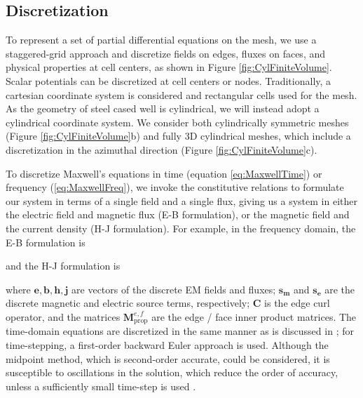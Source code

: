 \subsection{Discretization}
To represent a set of partial differential equations on the mesh, we use a staggered-grid approach \citep{Yee1966} and discretize fields on edges, fluxes on faces, and physical properties at cell centers, as shown in Figure \ref{fig:CylFiniteVolume}. Scalar potentials can be discretized at cell centers or nodes. Traditionally, a cartesian coordinate system is considered and rectangular cells used for the mesh. As the geometry of steel cased well is cylindrical, we will instead adopt a cylindrical coordinate system. We consider both cylindrically symmetric meshes (Figure \ref{fig:CylFiniteVolume}b) and fully 3D cylindrical meshes, which include a discretization in the azimuthal direction (Figure \ref{fig:CylFiniteVolume}c).




To discretize Maxwell's equations in time (equation \ref{eq:MaxwellTime}) or frequency (\ref{eq:MaxwellFreq}), we invoke the constitutive relations to formulate our system in terms of a single field and a single flux, giving us a system in either the electric field and magnetic flux (E-B formulation), or the magnetic field and the current density (H-J formulation). For example, in the frequency domain, the E-B formulation is

and the H-J formulation is

where $\mathbf{e}, \mathbf{b}, \mathbf{h}, \mathbf{j}$ are vectors of the discrete EM fields and fluxes; $\mathbf{s_m}$ and $\mathbf{s_e}$ are the discrete magnetic and electric source terms, respectively; $\mathbf{C}$ is the edge curl operator, and the matrices $\mathbf{M}_{\text{prop}}^{e,f}$ are the edge / face inner product matrices. The time-domain equations are discretized in the same manner as is discussed in \citep{Heagy2017}; for time-stepping, a first-order backward Euler approach is used. Although the midpoint method, which is second-order accurate, could be considered, it is susceptible to oscillations in the solution, which reduce the order of accuracy, unless a sufficiently small time-step is used \citep{Haber2004, Haber2014}.

